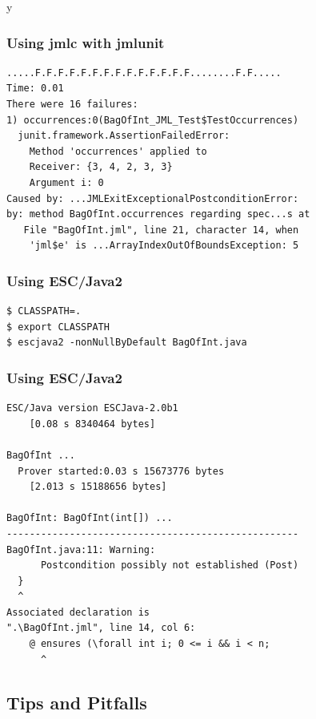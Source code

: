 \if y\MAKEHANDOUTS \documentclass[compress,landscape,handout]{beamer}
\begin{document}
\begin{frame}[fragile]
\frametitle{Using jmlc with jmlunit}

{\small
\begin{verbatim}
.....F.F.F.F.F.F.F.F.F.F.F.F.F.F........F.F.....
Time: 0.01
There were 16 failures:
1) occurrences:0(BagOfInt_JML_Test$TestOccurrences)
  junit.framework.AssertionFailedError:
    Method 'occurrences' applied to
    Receiver: {3, 4, 2, 3, 3}
    Argument i: 0
Caused by: ...JMLExitExceptionalPostconditionError:
by: method BagOfInt.occurrences regarding spec...s at
   File "BagOfInt.jml", line 21, character 14, when
    'jml$e' is ...ArrayIndexOutOfBoundsException: 5
\end{verbatim}
}
\end{frame}

\begin{frame}[fragile]
\frametitle{Using ESC/Java2}

\begin{example}
\begin{verbatim}
$ CLASSPATH=.
$ export CLASSPATH
$ escjava2 -nonNullByDefault BagOfInt.java
\end{verbatim}
\end{example}
\end{frame}

\begin{frame}[fragile]
\frametitle{Using ESC/Java2}

{\small
\begin{verbatim}
ESC/Java version ESCJava-2.0b1
    [0.08 s 8340464 bytes]

BagOfInt ...
  Prover started:0.03 s 15673776 bytes
    [2.013 s 15188656 bytes]

BagOfInt: BagOfInt(int[]) ...
---------------------------------------------------
BagOfInt.java:11: Warning: 
      Postcondition possibly not established (Post)
  }
  ^
Associated declaration is 
".\BagOfInt.jml", line 14, col 6:
    @ ensures (\forall int i; 0 <= i && i < n;
      ^
\end{verbatim}
}
\end{frame}

\subsection[Tips]{Tips and Pitfalls}
\end{document}
